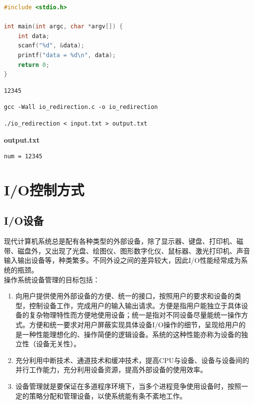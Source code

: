 \begin{lstlisting}[language=C]
#include <stdio.h>

int main(int argc, char *argv[]) {
    int data;
    scanf("%d", &data);
    printf("data = %d\n", data);
    return 0;
}
\end{lstlisting}

\begin{lstlisting}[title=input.txt]
12345
\end{lstlisting}

\begin{lstlisting}[title=编译]
gcc -Wall io_redirection.c -o io_redirection
\end{lstlisting}

\begin{lstlisting}[title=运行]
./io_redirection < input.txt > output.txt
\end{lstlisting}

\begin{tcolorbox}
    \textbf{output.txt}
    \begin{verbatim}
num = 12345
	\end{verbatim}
\end{tcolorbox}

\newpage

\section{I/O控制方式}

\subsection{I/O设备}

现代计算机系统总是配有各种类型的外部设备，除了显示器、键盘、打印机、磁带、磁盘外，又出现了光盘、绘图仪、图形数字化仪、鼠标器、激光打印机、声音输入输出设备等，种类繁多。不同外设之间的差异较大，因此I/O性能经常成为系统的瓶颈。\\

操作系统设备管理的目标包括：

\begin{enumerate}
    \item 向用户提供使用外部设备的方便、统一的接口，按照用户的要求和设备的类型，控制设备工作，完成用户的输入输出请求。方便是指用户能独立于具体设备的复杂物理特性而方便地使用设备；统一是指对不同设备尽量能统一操作方式。方便和统一要求对用户屏蔽实现具体设备I/O操作的细节，呈现给用户的是一种性能理想化的、操作简便的逻辑设备。系统的这种性能亦称为设备的独立性（设备无关性）。

    \item 充分利用中断技术、通道技术和缓冲技术，提高CPU与设备、设备与设备间的并行工作能力，充分利用设备资源，提高外部设备的使用效率。

    \item 设备管理就是要保证在多道程序环境下，当多个进程竞争使用设备时，按照一定的策略分配和管理设备，以使系统能有条不紊地工作。
\end{enumerate}

